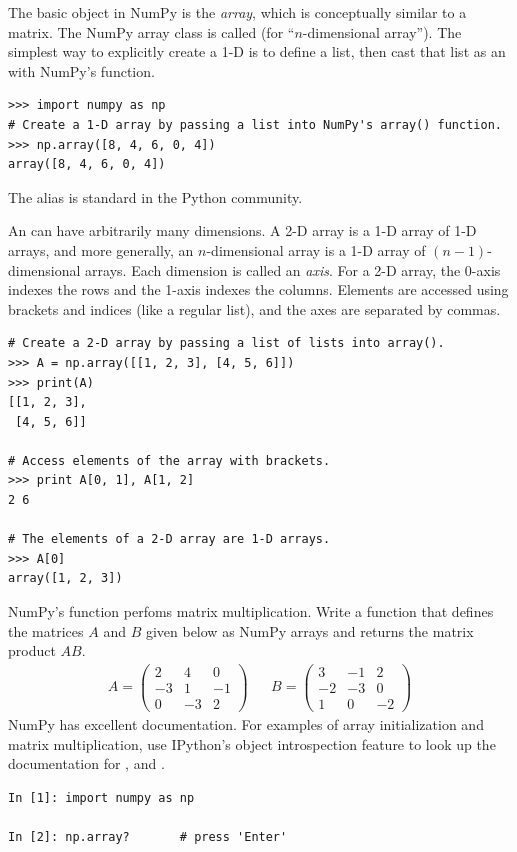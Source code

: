 The basic object in NumPy is the \emph{array}, which is conceptually similar to a matrix.
The NumPy array class is called  (for ``$n$-dimensional array'').
The simplest way to explicitly create a 1-D  is to define a list, then cast that list as an  with NumPy's  function.

\begin{lstlisting}
>>> import numpy as np
# Create a 1-D array by passing a list into NumPy's array() function.
>>> np.array([8, 4, 6, 0, 4])
array([8, 4, 6, 0, 4])
\end{lstlisting}
The alias  is standard in the Python community.

An  can have arbitrarily many dimensions.
A 2-D array is a 1-D array of 1-D arrays, and more generally, an $n$-dimensional array is a 1-D array of $(n-1)$-dimensional arrays.
Each dimension is called an \emph{axis}.
For a 2-D array, the 0-axis indexes the rows and the 1-axis indexes the columns.
Elements are accessed using brackets and indices (like a regular list), and the axes are separated by commas.

\begin{lstlisting}
# Create a 2-D array by passing a list of lists into array().
>>> A = np.array([[1, 2, 3], [4, 5, 6]])
>>> print(A)
[[1, 2, 3],
 [4, 5, 6]]

# Access elements of the array with brackets.
>>> print A[0, 1], A[1, 2]
2 6

# The elements of a 2-D array are 1-D arrays.
>>> A[0]
array([1, 2, 3])
\end{lstlisting}

\begin{problem} %
NumPy's  function perfoms matrix multiplication. %
Write a function that defines the matrices $A$ and $B$ given below as NumPy arrays and returns the matrix product $AB$.
%
\begin{align} \nonumber
A = \left(\begin{array}{rrr}
2 & 4 & 0 \\ 
-3 & 1 &-1 \\
0 & -3 & 2 \end{array}\right)
&&
B = \left(\begin{array}{rrr}
3 & -1 & 2 \\ 
-2 & -3 & 0 \\
1 & 0 & -2 \end{array}\right)
\end{align}
%
NumPy has excellent documentation.
For examples of array initialization and matrix multiplication, use IPython's object introspection feature to look up the documentation for ,  and .
\begin{lstlisting}
In [1]: import numpy as np

In [2]: np.array?       # press 'Enter'
\end{lstlisting}
\label{prob:simple_multiply}
\end{problem}

